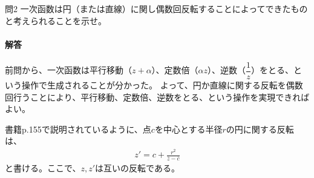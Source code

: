 \newpage
\begin{mysimplebox}{問2}
    一次函数は円（または直線）に関し偶数回反転することによってできたものと考えられることを示せ。
\end{mysimplebox}
%
%

\paragraph{解答}
前問から、一次函数は平行移動（$z+\alpha$）、定数倍（$\alpha z$）、逆数（$\dfrac{1}{z}$）をとる、という操作で生成されることが分かった。
よって、円か直線に関する反転を偶数回行うことにより、平行移動、定数倍、逆数をとる、という操作を実現できればよい。

書籍p.155で説明されているように、点$c$を中心とする半径$r$の円に関する反転は、
\begin{align*}
    z'=c+\frac{r^2}{\overline{z}-\overline{c}}
\end{align*}
と書ける。ここで、$z,z'$は互いの反転である。


